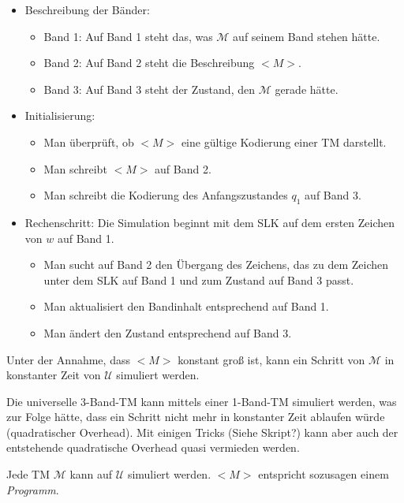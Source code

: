 \documentclass{scrartcl}%
\begin{document}
    \begin{itemize}
        \item Beschreibung der Bänder:
        \begin{itemize}
            \item Band 1: Auf Band 1 steht das, was $\mathcal{M}$ auf seinem Band stehen hätte.
            \item Band 2: Auf Band 2 steht die Beschreibung $<M>$.
            \item Band 3: Auf Band 3 steht der Zustand, den $\mathcal{M}$ gerade hätte.
        \end{itemize}
        \item Initialisierung:
        \begin{itemize}
            \item Man überprüft, ob $<M>$ eine gültige Kodierung einer TM darstellt.
            \item Man schreibt $<M>$ auf Band 2.
            \item Man schreibt die Kodierung des Anfangszustandes $q_1$ auf Band 3.
        \end{itemize}
        \item Rechenschritt: Die Simulation beginnt mit dem SLK auf dem ersten Zeichen von $w$ auf Band 1.
        \begin{itemize}
            \item Man sucht auf Band 2 den Übergang des Zeichens,
            das zu dem Zeichen unter dem SLK auf Band 1 und zum Zustand auf Band 3 passt.
            \item Man aktualisiert den Bandinhalt entsprechend auf Band 1.
            \item Man ändert den Zustand entsprechend auf Band 3.
        \end{itemize}
    \end{itemize}

    Unter der Annahme, dass $<M>$ konstant groß ist,
    kann ein Schritt von $\mathcal{M}$ in konstanter Zeit von $\mathcal{U}$ simuliert werden.

    Die universelle 3-Band-TM kann mittels einer 1-Band-TM simuliert werden, was zur Folge hätte,
    dass ein Schritt nicht mehr in konstanter Zeit ablaufen würde (quadratischer Overhead).
    Mit einigen Tricks (Siehe Skript?) kann aber auch der entstehende quadratische Overhead quasi vermieden werden.

    \vspace*{0.3cm}
    Jede TM $\mathcal{M}$ kann auf $\mathcal{U}$ simuliert werden. $<M>$ entspricht sozusagen einem \textit{Programm}.
\end{document}
